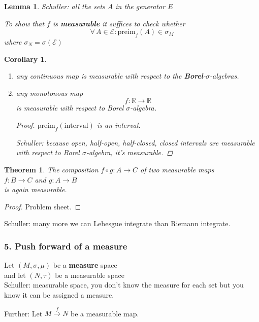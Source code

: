 \documentclass[10pt]{amsart}
\newtheorem{theorem}{Theorem}
\newtheorem{corollary}{Corollary}
\newtheorem{lemma}{Lemma}
\begin{document}
\begin{multicols*}{2}
\begin{lemma}
	Schuller: all the sets $A$ in the generator $E$

	To show that $f$ is \textbf{measurable} it suffices to check whether
	\[
	\forall \, A \in \mathcal{E}: \text{preim}_f(A) \in \sigma_M
	\]
	where $\sigma_N = \sigma(\mathcal{E})$
\end{lemma}

\begin{corollary}
	\begin{enumerate}
		\item[(i)] any continuous map is measurable with respect to the \textbf{Borel}-$\sigma$-algebras.
		\item[(ii)] any monotonous map
		\[
		f:\mathbb{R} \to \mathbb{R}
		\]
		is measurable with respect to Borel $\sigma$-algebra.
		\begin{proof}
			$\text{preim}_f(\text{interval})$ is an interval.
			
			Schuller: because open, half-open, half-closed, closed intervals are measurable with respect to Borel $\sigma$-algebra, it's measurable.
		\end{proof}
	\end{enumerate}
\end{corollary}

\begin{theorem}
	The composition $f\circ g : A \to C$ of two measurable maps \\
	$f:B\to C$ and $g:A \to B$ \\
	is again measurable.
\end{theorem}

\begin{proof}
	Problem sheet.
\end{proof}

Schuller: many more we can Lebesgue integrate than Riemann integrate.

\subsubsection{5. Push forward of a measure}

Let $(M, \sigma, \mu)$ be a \textbf{measure} space \\
and let $(N, \tau)$ be a measurable space \\

Schuller: measurable space, you don't know the measure for each set but you know it can be assigned a measure.

Further: Let $M \xrightarrow{f} N$ be a measurable map.


\end{multicols*}
\end{document}
